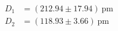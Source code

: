\begin{align}
D_1 &= \left(212.94 \pm 17.94\right)~\text{pm}\\
D_2 &= \left(118.93 \pm 3.66\right)~\text{pm}
\label{eq:gitterabst_result}
\end{align}
